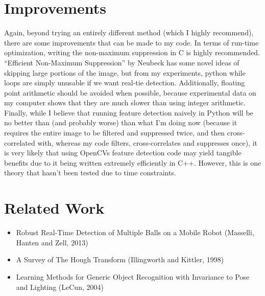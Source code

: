 \documentclass[11pt]{article}
\begin{document}
\section{Improvements}
Again, beyond trying an entirely different method (which I highly recommend), there are some improvements that can be made to my code.  In terms of run-time optimization, writing the non-maximum suppression in C is highly recommended.  ``Efficient Non-Maximum Suppression'' by Neubeck has some novel ideas of skipping large portions of the image, but from my experiments, python while loops are simply unusable if we want real-tie detection.  Additionally, floating point arithmetic should be avoided when possible, because experimental data on my computer shows that they are much slower than using integer arithmetic.  Finally, while I believe that running feature detection naively in Python will be no better than (and probably worse) than what I'm doing now (because it requires the entire image to be filtered and suppressed twice, and then cross-correlated with, whereas my code filters, cross-correlates and suppresses once), it is very likely that using OpenCVs feature detection code may yield tangible benefits due to it being written extremely efficiently in C++.  However, this is one theory that hasn't been tested due to time constraints.

\section{Related Work}
\begin{itemize}
\item Robust Real-Time Detection of Multiple Balls on a Mobile Robot (Masselli, Hanten and Zell, 2013)
\item A Survey of The Hough Transform (Illingworth and Kittler, 1998)
\item Learning Methods for Generic Object Recognition with Invariance to Pose and Lighting (LeCun, 2004)
\end{itemize}
\end{document}
